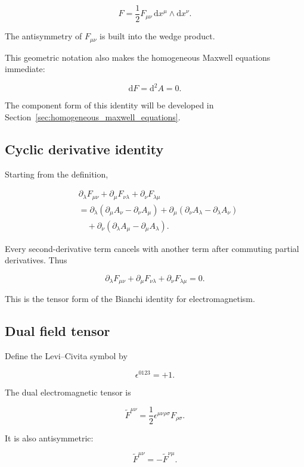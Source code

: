 \[
F
=
\frac{1}{2}
F_{\mu\nu}
\,\mathrm{d}x^{\mu}
\wedge
\mathrm{d}x^{\nu}.
\]

The antisymmetry of \(F_{\mu\nu}\) is built into the wedge product.

This geometric notation also makes the homogeneous Maxwell equations immediate:

\[
\mathrm{d}F
=
\mathrm{d}^{2}A
=0.
\]

The component form of this identity will be developed in Section~\ref{sec:homogeneous_maxwell_equations}.

\subsection{Cyclic derivative identity}

Starting from the definition,

\[
\begin{aligned}
&\partial_{\lambda}F_{\mu\nu}
+
\partial_{\mu}F_{\nu\lambda}
+
\partial_{\nu}F_{\lambda\mu}
\\
&=
\partial_{\lambda}
\left(
\partial_{\mu}A_{\nu}
-
\partial_{\nu}A_{\mu}
\right)
+
\partial_{\mu}
\left(
\partial_{\nu}A_{\lambda}
-
\partial_{\lambda}A_{\nu}
\right)
\\
&\quad+
\partial_{\nu}
\left(
\partial_{\lambda}A_{\mu}
-
\partial_{\mu}A_{\lambda}
\right).
\end{aligned}
\]

Every second-derivative term cancels with another term after commuting partial derivatives. Thus

\[
\boxed{
\partial_{\lambda}F_{\mu\nu}
+
\partial_{\mu}F_{\nu\lambda}
+
\partial_{\nu}F_{\lambda\mu}
=0
}.
\]

This is the tensor form of the Bianchi identity for electromagnetism.

\subsection{Dual field tensor}

Define the Levi--Civita symbol by

\[
\epsilon^{0123}=+1.
\]

The dual electromagnetic tensor is

\[
\boxed{
\widetilde{F}^{\mu\nu}
=
\frac{1}{2}
\epsilon^{\mu\nu\rho\sigma}
F_{\rho\sigma}
}.
\]

It is also antisymmetric:

\[
\widetilde{F}^{\mu\nu}
=
-\widetilde{F}^{\nu\mu}.
\]

